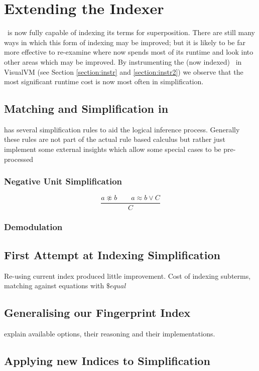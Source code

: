 \section{Extending the Indexer}

\Beagle\ is now fully capable of indexing its terms for superposition. There
are still many ways in which this form of indexing may be improved; but it is likely
to be far more effective to re-examine where \beagle now spends most of its runtime
and look into other areas which may be improved. By instrumenting the (now indexed)
\beagle\ in VisualVM (see Section \ref{section:instr} and \ref{section:instr2})
we observe that the most significant runtime cost is now most often in simplification.

\subsection{Matching and Simplification in \Beagle}
\Beagle has several simplification rules to aid the logical inference process.
Generally these rules are not part of the actual rule based calculus but rather
just implement some external insights which allow some special cases to be
pre-processed

\subsubsection{Negative Unit Simplification}

\[ \frac{a\not\approx b \quad \quad a \approx b  \lor C}{C} \]

\subsubsection{Demodulation}


\subsection{First Attempt at Indexing Simplification}
Re-using current index produced little improvement. Cost of indexing
subterms, matching against equations with $\$equal$

\subsection{Generalising our Fingerprint Index}

explain available options, their reasoning and their implementations.

\subsection{Applying new Indices to Simplification}



